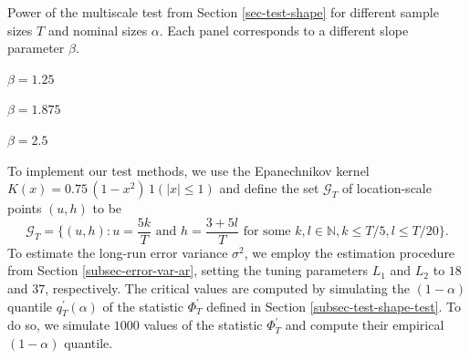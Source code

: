 \begin{table}[t]
\footnotesize{
\begin{center}
\caption{Power of the multiscale test from Section \ref{sec-test-shape} for different sample sizes $T$ and nominal sizes $\alpha$. Each panel corresponds to a different slope parameter $\beta$.}\label{tab:power_ll_shape}
\begin{subtable}[b]{0.32\textwidth}
\centering
\caption{$\beta = 1.25$}\label{tab:power_050_ll_shape}
\renewcommand{\arraystretch}{1.2}

\end{subtable}
\begin{subtable}[b]{0.32\textwidth}
\centering
\caption{$\beta = 1.875$}\label{tab:power_075_ll_shape}
\renewcommand{\arraystretch}{1.2}

\end{subtable}
\begin{subtable}[b]{0.32\textwidth}
\centering
\caption{$\beta = 2.5$}\label{tab:power_100_ll_shape}
\renewcommand{\arraystretch}{1.2}

\end{subtable}
\end{center}}
\end{table}

To implement our test methods, we use the Epanechnikov kernel $K(x) = 0.75 \, (1 - x^2) \, 1(|x| \le 1)$ and define the set $\mathcal{G}_T$ of location-scale points $(u,h)$ to be 
\begin{equation}\label{grid-sim-app}
\mathcal{G}_T = \{(u, h): u = \frac{5k}{T} \text{ and } h = \frac{3+5l}{T} \text{ for some } k, l \in \mathbb{N}, k \le T/5, l \le T/20\}. 
\end{equation}
To estimate the long-run error variance $\sigma^2$, we employ the estimation procedure from Section \ref{subsec-error-var-ar}, setting the tuning parameters $L_1$ and $L_2$ to $18$ and $37$, respectively. The critical values are computed by simulating the $(1-\alpha)$ quantile $q_T^\prime(\alpha)$ of the statistic $\Phi^\prime_T$ defined in Section \ref{subsec-test-shape-test}. To do so, we simulate $1000$ values of the statistic $\Phi^\prime_T$ and compute their empirical $(1-\alpha)$ quantile. 


